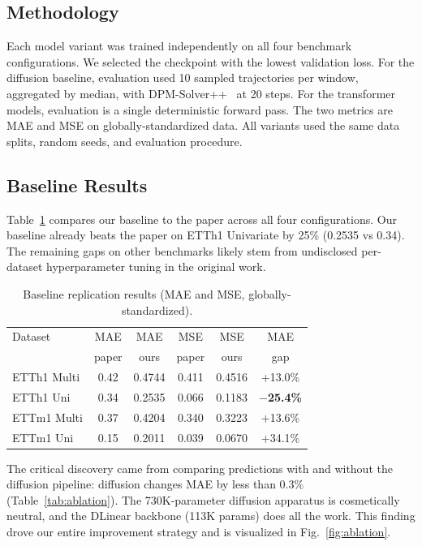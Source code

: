 \documentclass[conference]{IEEEtran}
\newcommand{\good}[1]{\textbf{#1}}
\begin{document}
\subsection{Methodology}
Each model variant was trained independently on all four benchmark configurations. We selected the checkpoint with the lowest validation loss. For the diffusion baseline, evaluation used 10 sampled trajectories per window, aggregated by median, with DPM-Solver++~\cite{dpmsolver} at 20 steps. For the transformer models, evaluation is a single deterministic forward pass. The two metrics are MAE and MSE on globally-standardized data. All variants used the same data splits, random seeds, and evaluation procedure.

\subsection{Baseline Results}
Table~\ref{tab:baseline} compares our baseline to the paper across all four configurations. Our baseline already beats the paper on ETTh1 Univariate by 25\% (0.2535 vs 0.34). The remaining gaps on other benchmarks likely stem from undisclosed per-dataset hyperparameter tuning in the original work.

\begin{table}[t]
\caption{Baseline replication results (MAE and MSE, globally-standardized).}
\label{tab:baseline}
\centering
\small
\begin{tabular}{lccccc}
\toprule
Dataset & MAE & MAE & MSE & MSE & MAE \\
        & paper & ours & paper & ours & gap \\
\midrule
ETTh1 Multi & 0.42 & 0.4744 & 0.411 & 0.4516 & +13.0\% \\
ETTh1 Uni   & 0.34 & 0.2535 & 0.066 & 0.1183 & \good{$-$25.4\%} \\
ETTm1 Multi & 0.37 & 0.4204 & 0.340 & 0.3223 & +13.6\% \\
ETTm1 Uni   & 0.15 & 0.2011 & 0.039 & 0.0670 & +34.1\% \\
\bottomrule
\end{tabular}
\end{table}

The critical discovery came from comparing predictions with and without the diffusion pipeline: diffusion changes MAE by less than 0.3\% (Table~\ref{tab:ablation}). The 730K-parameter diffusion apparatus is cosmetically neutral, and the DLinear backbone (113K params) does all the work. This finding drove our entire improvement strategy and is visualized in Fig.~\ref{fig:ablation}.
\end{document}
